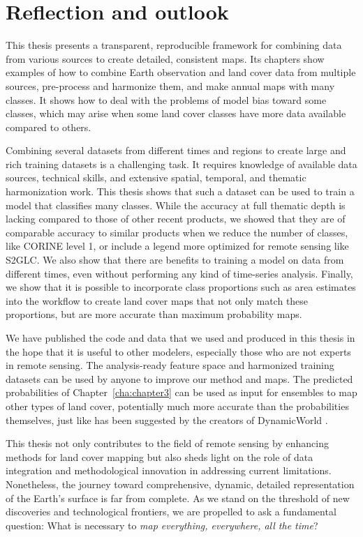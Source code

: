 \section{Reflection and outlook}

    This thesis presents a transparent, reproducible framework for combining data from various sources to create detailed, consistent maps. Its chapters show examples of how to combine Earth observation and land cover data from multiple sources, pre-process and harmonize them, and make annual maps with many classes. It shows how to deal with the problems of model bias toward some classes, which may arise when some land cover classes have more data available compared to others.
    
    Combining several datasets from different times and regions to create large and rich training datasets is a challenging task. It requires knowledge of available data sources, technical skills, and extensive spatial, temporal, and thematic harmonization work. This thesis shows that such a dataset can be used to train a model that classifies many classes. While the accuracy at full thematic depth is lacking compared to those of other recent products, we showed that they are of comparable accuracy to similar products when we reduce the number of classes, like CORINE level 1, or include a legend more optimized for remote sensing like S2GLC. We also show that there are benefits to training a model on data from different times, even without performing any kind of time-series analysis. Finally, we show that it is possible to incorporate class proportions such as area estimates into the workflow to create land cover maps that not only match these proportions, but are more accurate than maximum probability maps.

    We have published the code and data that we used and produced in this thesis in the hope that it is useful to other modelers, especially those who are not experts in remote sensing. The analysis-ready feature space and harmonized training datasets can be used by anyone to improve our method and maps. The predicted probabilities of Chapter\@~\ref{cha:chapter3} can be used as input for ensembles to map other types of land cover, potentially much more accurate than the probabilities themselves, just like has been suggested by the creators of DynamicWorld \citep{brown2022dynamic}.

    This thesis not only contributes to the field of remote sensing by enhancing methods for land cover mapping but also sheds light on the role of data integration and methodological innovation in addressing current limitations. Nonetheless, the journey toward comprehensive, dynamic, detailed representation of the Earth's surface is far from complete. As we stand on the threshold of new discoveries and technological frontiers, we are propelled to ask a fundamental question: What is necessary to \textit{map everything, everywhere, all the time}?

